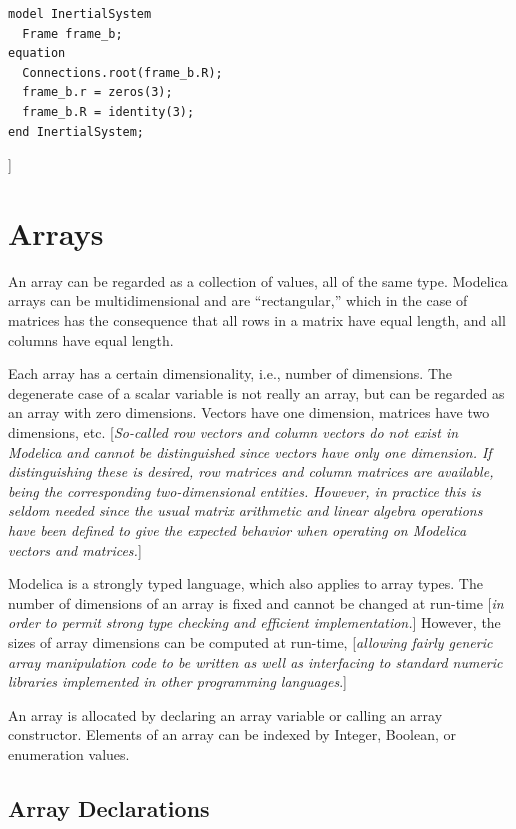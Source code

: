 \documentclass[10pt,a4paper]{report}
\def\doublelabel#1{\label{#1}\hypertarget{#1}{}}
\begin{document}
\begin{lstlisting}[language=modelica]
model InertialSystem
  Frame frame_b;
equation
  Connections.root(frame_b.R);
  frame_b.r = zeros(3);
  frame_b.R = identity(3);
end InertialSystem;
\end{lstlisting}
{]}

\chapter{Arrays}\doublelabel{arrays}

An array can be regarded as a collection of values, all of the same
type. Modelica arrays can be multidimensional and are ``rectangular,''
which in the case of matrices has the consequence that all rows in a
matrix have equal length, and all columns have equal length.

Each array has a certain dimensionality, i.e., number of dimensions. The
degenerate case of a scalar variable is not really an array, but can be
regarded as an array with zero dimensions. Vectors have one dimension,
matrices have two dimensions, etc. {[}\emph{So-called row vectors and
column vectors do not exist in Modelica and cannot be distinguished
since vectors have only one dimension. If distinguishing these is
desired, row matrices and column matrices are available, being the
corresponding two-dimensional entities. However, in practice this is
seldom needed since the usual matrix arithmetic and linear algebra
operations have been defined to give the expected behavior when
operating on Modelica vectors and matrices.}{]}

Modelica is a strongly typed language, which also applies to array
types. The number of dimensions of an array is fixed and cannot be
changed at run-time {[}\emph{in order to permit strong type checking and
efficient implementation.}{]} However, the sizes of array dimensions can
be computed at run-time, {[}\emph{allowing fairly generic array
manipulation code to be written as well as interfacing to standard
numeric libraries implemented in other programming languages}.{]}

An array is allocated by declaring an array variable or calling an array
constructor. Elements of an array can be indexed by Integer, Boolean, or
enumeration values.

\section{Array Declarations}\doublelabel{array-declarations}
\end{document}
